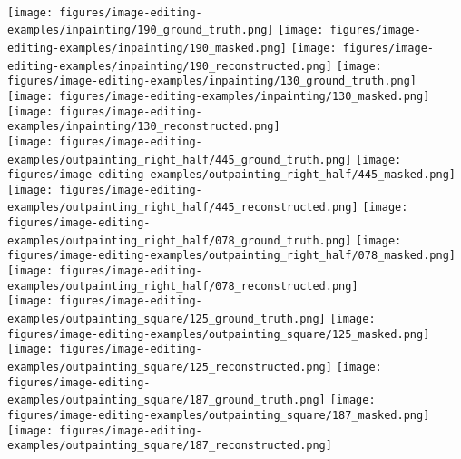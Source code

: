 \begin{figure*}[h]
\centering
    \hhs
    \hhs
    \hspace{0.03\linewidth}
    \hhs
    \hhs
    \vvs
    \\
    \texttt{[image: figures/image-editing-examples/inpainting/190\_ground\_truth.png]}\hhs
    \texttt{[image: figures/image-editing-examples/inpainting/190\_masked.png]}\hhs
    \texttt{[image: figures/image-editing-examples/inpainting/190\_reconstructed.png]}\hspace{0.03\linewidth}
    \texttt{[image: figures/image-editing-examples/inpainting/130\_ground\_truth.png]}\hhs
    \texttt{[image: figures/image-editing-examples/inpainting/130\_masked.png]}\hhs
    \texttt{[image: figures/image-editing-examples/inpainting/130\_reconstructed.png]}\vvs
    \\
    \texttt{[image: figures/image-editing-examples/outpainting\_right\_half/445\_ground\_truth.png]}\hhs
    \texttt{[image: figures/image-editing-examples/outpainting\_right\_half/445\_masked.png]}\hhs
    \texttt{[image: figures/image-editing-examples/outpainting\_right\_half/445\_reconstructed.png]}\hspace{0.03\linewidth}
    \texttt{[image: figures/image-editing-examples/outpainting\_right\_half/078\_ground\_truth.png]}\hhs
    \texttt{[image: figures/image-editing-examples/outpainting\_right\_half/078\_masked.png]}\hhs
    \texttt{[image: figures/image-editing-examples/outpainting\_right\_half/078\_reconstructed.png]}\vvs
    \\
    \texttt{[image: figures/image-editing-examples/outpainting\_square/125\_ground\_truth.png]}\hhs
    \texttt{[image: figures/image-editing-examples/outpainting\_square/125\_masked.png]}\hhs
    \texttt{[image: figures/image-editing-examples/outpainting\_square/125\_reconstructed.png]}\hspace{0.03\linewidth}
    \texttt{[image: figures/image-editing-examples/outpainting\_square/187\_ground\_truth.png]}\hhs
    \texttt{[image: figures/image-editing-examples/outpainting\_square/187\_masked.png]}\hhs
    \texttt{[image: figures/image-editing-examples/outpainting\_square/187\_reconstructed.png]}\vvs
    \label{fig:more-editing}
\end{figure*}
